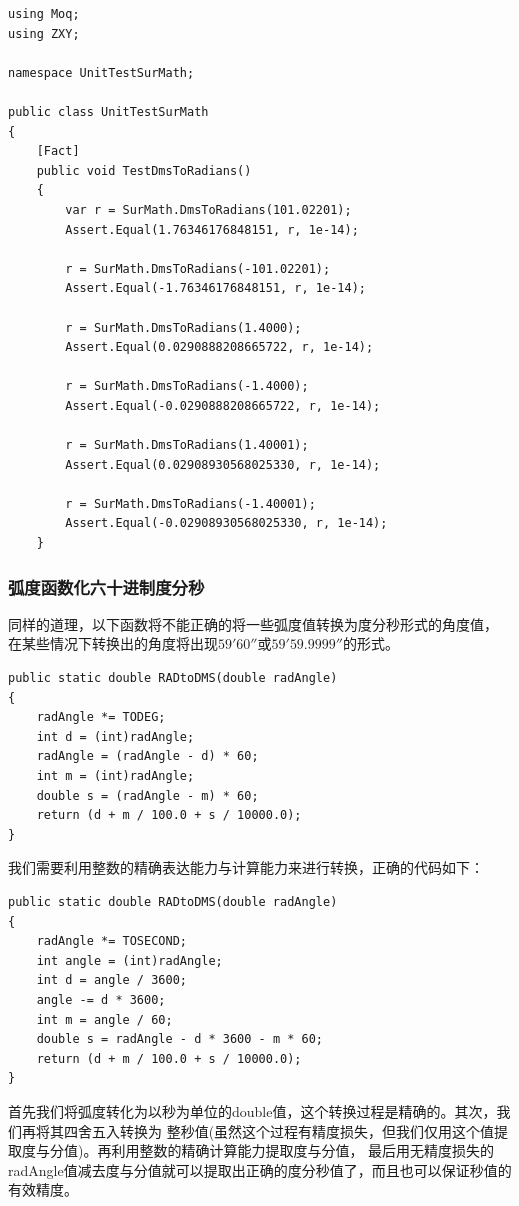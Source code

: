 \begin{lstlisting}
using Moq;
using ZXY;

namespace UnitTestSurMath;

public class UnitTestSurMath
{
    [Fact]
    public void TestDmsToRadians()
    {
        var r = SurMath.DmsToRadians(101.02201);
        Assert.Equal(1.76346176848151, r, 1e-14);

        r = SurMath.DmsToRadians(-101.02201);
        Assert.Equal(-1.76346176848151, r, 1e-14);

        r = SurMath.DmsToRadians(1.4000);
        Assert.Equal(0.0290888208665722, r, 1e-14);

        r = SurMath.DmsToRadians(-1.4000);
        Assert.Equal(-0.0290888208665722, r, 1e-14);

        r = SurMath.DmsToRadians(1.40001);
        Assert.Equal(0.02908930568025330, r, 1e-14);

        r = SurMath.DmsToRadians(-1.40001);
        Assert.Equal(-0.02908930568025330, r, 1e-14);
    }
\end{lstlisting}




\subsubsection{弧度函数化六十进制度分秒}

同样的道理，以下函数将不能正确的将一些弧度值转换为度分秒形式的角度值，
在某些情况下转换出的角度将出现$59'60''$或$59'59.9999''$的形式。

\begin{lstlisting}
public static double RADtoDMS(double radAngle)
{
    radAngle *= TODEG;
    int d = (int)radAngle;
    radAngle = (radAngle - d) * 60;
    int m = (int)radAngle;
    double s = (radAngle - m) * 60;
    return (d + m / 100.0 + s / 10000.0);
}
\end{lstlisting}

我们需要利用整数的精确表达能力与计算能力来进行转换，正确的代码如下：

\begin{lstlisting}
public static double RADtoDMS(double radAngle)
{
    radAngle *= TOSECOND;
    int angle = (int)radAngle; 
    int d = angle / 3600;
    angle -= d * 3600;
    int m = angle / 60;
    double s = radAngle - d * 3600 - m * 60;
    return (d + m / 100.0 + s / 10000.0);
}
\end{lstlisting}

首先我们将弧度转化为以秒为单位的double值，这个转换过程是精确的。其次，我们再将其四舍五入转换为
整秒值(虽然这个过程有精度损失，但我们仅用这个值提取度与分值)。再利用整数的精确计算能力提取度与分值，
最后用无精度损失的radAngle值减去度与分值就可以提取出正确的度分秒值了，而且也可以保证秒值的有效精度。

